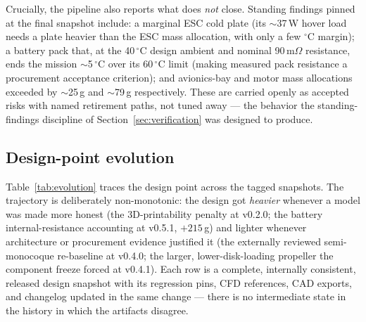 Crucially, the pipeline also reports what does \emph{not} close.
Standing findings pinned at the final snapshot include: a marginal ESC
cold plate (its $\sim$37\,W hover load needs a plate heavier than the
ESC mass allocation, with only a few $^{\circ}$C margin); a battery
pack that, at the 40\,$^{\circ}$C design ambient and nominal
90\,m$\Omega$ resistance, ends the mission $\sim$5\,$^{\circ}$C over
its 60\,$^{\circ}$C limit (making measured pack resistance a
procurement acceptance criterion); and avionics-bay and motor mass
allocations exceeded by $\sim$25\,g and $\sim$79\,g respectively.
These are carried openly as accepted risks with named retirement
paths, not tuned away --- the behavior the standing-findings
discipline of Section~\ref{sec:verification} was designed to produce.

\subsection{Design-point evolution}
\label{sec:evolution}

Table~\ref{tab:evolution} traces the design point across the tagged
snapshots. The trajectory is deliberately non-monotonic: the design
got \emph{heavier} whenever a model was made more honest (the
3D-printability penalty at v0.2.0; the battery internal-resistance
accounting at v0.5.1, $+215$\,g) and lighter whenever architecture or
procurement evidence justified it (the externally reviewed
semi-monocoque re-baseline at v0.4.0; the larger, lower-disk-loading
propeller the component freeze forced at v0.4.1). Each row is a
complete, internally consistent, released design snapshot with its
regression pins, CFD references, CAD exports, and changelog updated in
the same change --- there is no intermediate state in the history in
which the artifacts disagree.

